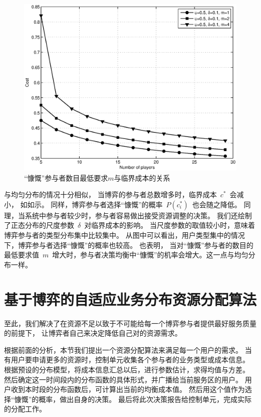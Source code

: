 \begin{figure}[!tb]
\begin{centering}
\includegraphics[scale=0.5]{bayesian_normal_punish_parameter_vs_contribute_probability.eps}
\caption{“慷慨”参与者数目最低要求$m$与临界成本的关系}
\label{fig:bayesian_normal_puni_para_vs_cont_prob}
\end{centering}
\end{figure}

与均匀分布的情况十分相似，
当博弈的参与者总数增多时，临界成本~$c^*$~会减小， 如如示。
同样，博弈参与者选择“慷慨”的概率~$P(c_i^*)$~也会随之降低。
同理，当系统中参与者较少时，参与者容易做出接受资源调整的决策。
我们还绘制了正态分布的尺度参数~$\delta$~对临界成本的影响。
当尺度参数的取值较小时，意味着博弈参与者的类型分布集中比较集中。
从图中可以看出，用户类型集中的情况下，博弈参与者选择“慷慨”的概率也较高。
也表明，
当对“慷慨”参与者的数目的最低要求值~$m$~增大时，参与者决策均衡中“慷慨”的机率会增大。这一点与均匀分布一样。

\section{基于博弈的自适应业务分布资源分配算法}
至此，我们解决了在资源不足以致于不可能给每一个博弈参与者提供最好服务质量的前提下，
让博弈者自己来决定降低自己对的资源需求。

根据前面的分析，本节我们提出一个资源分配算法来满足每一个用户的需求。
当有用户要申请更多的资源时，控制单元收集各个参与者的业务类型或成本信息。
根据预设的分布模型，将成本信息汇总以后，进行参数估计，求得均值与方差。
然后确定这一时间段内的分布函数的具体形式，并广播给当前服务区的用户。
用户收到本时段的分布函数后，可计算出当前的均衡成本值。
然后用这个值作为选择“慷慨”的概率，做出自身的决策。
最后将此次决策报告给控制单元，完成实际的分配工作。

